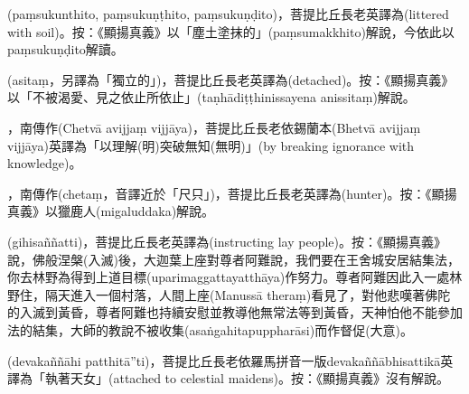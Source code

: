 \startitemgroup[noteitems]
\item{}(paṃsukunthito, paṃsukuṇṭhito, paṃsukuṇḍito)，菩提比丘長老英譯為(littered with soil)。按：《顯揚真義》以「塵土塗抹的」(paṃsumakkhito)解說，今依此以paṃsukuṇḍito解讀。
\stopitemgroup

\startitemgroup[noteitems]
\item{}(asitaṃ，另譯為「獨立的」)，菩提比丘長老英譯為(detached)。按：《顯揚真義》以「不被渴愛、見之依止所依止」(taṇhādiṭṭhinissayena anissitaṃ)解說。
\stopitemgroup

\startitemgroup[noteitems]
\item{}，南傳作(Chetvā avijjaṃ vijjāya)，菩提比丘長老依錫蘭本(Bhetvā avijjaṃ vijjāya)英譯為「以理解(明)突破無知(無明)」(by breaking ignorance with knowledge)。
\stopitemgroup

\startitemgroup[noteitems]
\item{}，南傳作(chetaṃ，音譯近於「尺只」)，菩提比丘長老英譯為(hunter)。按：《顯揚真義》以獵鹿人(migaluddaka)解說。
\stopitemgroup

\startitemgroup[noteitems]
\item{}(gihisaññatti)，菩提比丘長老英譯為(instructing lay people)。按：《顯揚真義》說，佛般涅槃(入滅)後，大迦葉上座對尊者阿難說，我們要在王舍城安居結集法，你去林野為得到上道目標(uparimaggattayatthāya)作努力。尊者阿難因此入一處林野住，隔天進入一個村落，人間上座(Manussā theraṃ)看見了，對他悲嘆著佛陀的入滅到黃昏，尊者阿難也持續安慰並教導他無常法等到黃昏，天神怕他不能參加法的結集，大師的教說不被收集(asaṅgahitapuppharāsi)而作督促(大意)。
\stopitemgroup

\startitemgroup[noteitems]
\item{}(devakaññāhi patthitā”ti)，菩提比丘長老依羅馬拼音一版devakaññābhisattikā英譯為「執著天女」(attached to celestial maidens)。按：《顯揚真義》沒有解說。
\stopitemgroup

